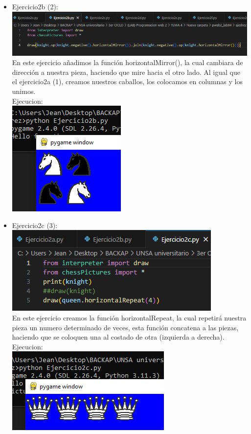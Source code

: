 \documentclass[]{article}
\begin{document}
\begin{itemize}
            \item Ejercicio2b (2): \\
            \includegraphics[]{../img/img6.png}\\
            En este ejercicio añadimos la función horizontalMirror(), la cual cambiara de dirección a nuestra
            pieza, haciendo que mire hacia el otro lado. Al igual que el ejercicio2a (1), creamos nuestros
            caballos, los colocamos en columnas y los unimos. \\
            Ejecucion:\\
            \includegraphics[]{../img/img7.png}\\

            \item Ejercicio2c (3): \\
            \includegraphics[]{../img/img8.png}\\
            En este ejercicio creamos la función horizontalRepeat, la cual repetirá nuestra pieza un numero
            determinado de veces, esta función concatena a las piezas, haciendo que se coloquen una al costado de otra (izquierda a derecha).\\
            Ejecucion:\\
            \includegraphics[]{../img/img9.png}\\


\end{itemize}
\end{document}
